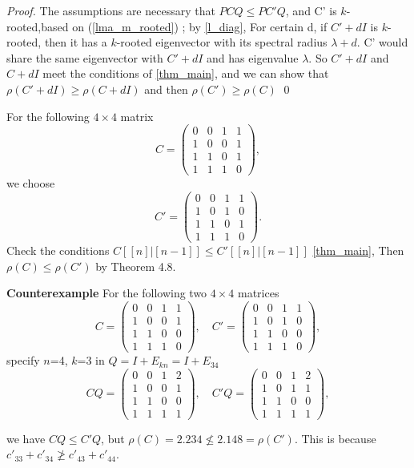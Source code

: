 \documentclass[12pt]{report}
\theoremstyle{plain}
\theoremstyle{definition}
\begin{document}
\begin{proof}

The assumptions are necessary that $PCQ \leq PC'Q$, and C' is $k$-rooted,based on
 (\ref{lma_m_rooted}) ; by \ref{l_diag}, For certain d, if $C'+dI$ is $k$-rooted, then it has
  a $k$-rooted eigenvector with its spectral radius $\lambda + d$. C' would share the same
   eigenvector with $C'+dI$ and has eigenvalue $\lambda$. So $C'+dI$ and $C+dI$ meet the
    conditions of \ref{thm_main}, and we can show that $\rho(C' + dI) \geq \rho(C +dI)$ and
     then $\rho(C') \geq \rho(C)$  \qed
\end{proof}



For the following $4\times 4$ matrix
$$C=\begin{pmatrix}
0 & 0 & 1 & 1\\
1 & 0 & 0 & 1\\
1 & 1 & 0 & 1\\
1 & 1 & 1 & 0
\end{pmatrix},$$
we choose
$$C'=\begin{pmatrix}
0 & 0 & 1 & 1\\
1 & 0 & 1 &  0\\
1 & 1 & 0 & 1\\
1 & 1 & 1 & 0
\end{pmatrix}.$$
Check the conditions $C[[n]|[n-1]]  \leq C'[[n]|[n-1]] $ \ref{thm_main},   
Then
$\rho(C)\leq \rho(C')$ by Theorem 4.8.




{\bf Counterexample}
For the following two $4\times 4$ matrices
$$C=\begin{pmatrix}
0 & 0 & 1 & 1\\
1 & 0 & 0 & 1\\
1 & 1 & 0 & 0\\
1 & 1 & 1 & 0
\end{pmatrix},\quad C'=\begin{pmatrix}
0 & 0 & 1 & 1\\
1 & 0 & 1 &  0\\
1 & 1 & 0 & 0\\
1 & 1 & 1 & 0
\end{pmatrix},$$
specify $n$=4, $k$=3 in $Q = I +E_{kn} = I + E_{34}$  
$$CQ=\begin{pmatrix}
0 & 0 & 1 & 2\\
1 & 0 & 0 & 1\\
1 & 1 & 0 & 0\\
1 & 1 & 1 & 1
\end{pmatrix},\quad C'Q=\begin{pmatrix}
0 & 0 & 1 & 2\\
1 & 0 & 1 & 1\\
1 & 1 & 0 & 0\\
1 & 1 & 1 & 1
\end{pmatrix},$$

we have $CQ\leq C'Q$, but
$\rho(C)=2.234\not\leq 2.148= \rho(C')$.
This is because $c'_{33}+c'_{34}\not\geq c'_{43}+c'_{44}$.
\end{document}
